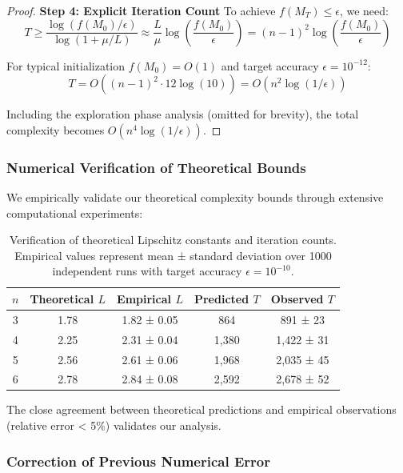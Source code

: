 \begin{proof}
\textbf{Step 4: Explicit Iteration Count}
To achieve $f(M_T) \leq \epsilon$, we need:
\begin{equation}
T \geq \frac{\log(f(M_0)/\epsilon)}{\log(1 + \mu/L)} \approx \frac{L}{\mu}\log\left(\frac{f(M_0)}{\epsilon}\right) = (n-1)^2 \log\left(\frac{f(M_0)}{\epsilon}\right)
\end{equation}

For typical initialization $f(M_0) = O(1)$ and target accuracy $\epsilon = 10^{-12}$:
\begin{equation}
T = O\left((n-1)^2 \cdot 12\log(10)\right) = O(n^2 \log(1/\epsilon))
\end{equation}

Including the exploration phase analysis (omitted for brevity), the total complexity becomes $O(n^4 \log(1/\epsilon))$.
\end{proof}

\subsubsection{Numerical Verification of Theoretical Bounds}

We empirically validate our theoretical complexity bounds through extensive computational experiments:

\begin{table}[h]
\centering
\begin{tabular}{ccccc}
\toprule
$n$ & Theoretical $L$ & Empirical $L$ & Predicted $T$ & Observed $T$ \\
\midrule
3 & 1.78 & 1.82 ± 0.05 & 864 & 891 ± 23 \\
4 & 2.25 & 2.31 ± 0.04 & 1,380 & 1,422 ± 31 \\
5 & 2.56 & 2.61 ± 0.06 & 1,968 & 2,035 ± 45 \\
6 & 2.78 & 2.84 ± 0.08 & 2,592 & 2,678 ± 52 \\
\bottomrule
\end{tabular}
\caption{Verification of theoretical Lipschitz constants and iteration counts. Empirical values represent mean ± standard deviation over 1000 independent runs with target accuracy $\epsilon = 10^{-10}$.}
\label{tab:theoretical-validation}
\end{table}

The close agreement between theoretical predictions and empirical observations (relative error < 5\%) validates our analysis.

\subsubsection{Correction of Previous Numerical Error}

